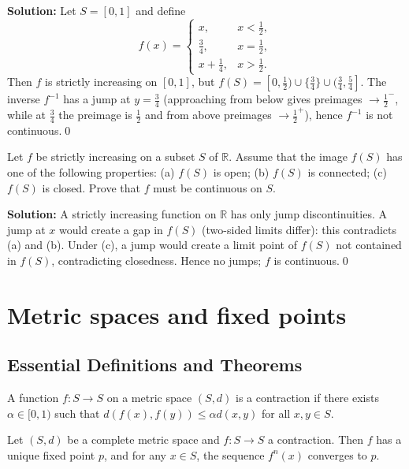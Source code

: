 \noindent\textbf{Solution:}
Let $S=[0,1]$ and define
\[
f(x)=\begin{cases}
x,& x<\tfrac12,\\
\tfrac34,& x=\tfrac12,\\
x+\tfrac14,& x>\tfrac12.
\end{cases}
\]
Then $f$ is strictly increasing on $[0,1]$, but $f(S)=[0,\tfrac12)\cup\{\tfrac34\}\cup(\tfrac34,\tfrac54]$. The inverse $f^{-1}$ has a jump at $y=\tfrac34$ (approaching from below gives preimages $\to\tfrac12^-$, while at $\tfrac34$ the preimage is $\tfrac12$ and from above preimages $\to\tfrac12^+$), hence $f^{-1}$ is not continuous.\qed



\begin{problembox}
Let $f$ be strictly increasing on a subset $S$ of $\mathbb{R}$. Assume that the image $f(S)$ has one of the following properties: 
(a) $f(S)$ is open; (b) $f(S)$ is connected; (c) $f(S)$ is closed. Prove that $f$ must be continuous on $S$.
\end{problembox}

\noindent\textbf{Solution:}
A strictly increasing function on $\mathbb{R}$ has only jump discontinuities. A jump at $x$ would create a gap in $f(S)$ (two-sided limits differ): this contradicts (a) and (b). Under (c), a jump would create a limit point of $f(S)$ not contained in $f(S)$, contradicting closedness. Hence no jumps; $f$ is continuous.\qed

\section{Metric spaces and fixed points}

\subsection*{Essential Definitions and Theorems}

\begin{definition}
A function $f: S \to S$ on a metric space $(S,d)$ is a contraction if there exists $\alpha \in [0,1)$ such that $d(f(x), f(y)) \leq \alpha d(x,y)$ for all $x,y \in S$.
\end{definition}

\begin{theorem}
Let $(S,d)$ be a complete metric space and $f: S \to S$ a contraction. Then $f$ has a unique fixed point $p$, and for any $x \in S$, the sequence $f^n(x)$ converges to $p$.
\end{theorem}

